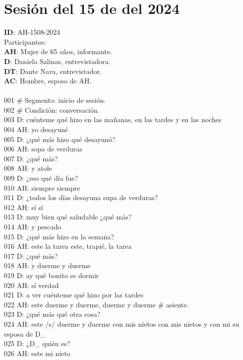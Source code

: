 \section{Sesión del 15 de del 2024}
\noindent
\textbf{ID}: AH-1508-2024\\
Participantes:\\
\textbf{AH}: Mujer de 65 años, informante.\\
\textbf{D}: Daniela Salinas, entrevistadora.\\
\textbf{DT}: Dante Nava, entrevistador.\\
\textbf{AC}: Hombre, esposo de AH.\\
\\
001 \# Segmento: inicio de sesión.\\
002 \# Condición: conversación.\\
003 D: cuénteme qué hizo en las mañanas, en las tardes y en las noches\\
004 AH: yo desayuné\\
005 D: ¿qué más hizo qué desayunó?\\
006 AH: sopa de verduras\\
007 D: ¿qué más?\\
008 AH: y atole\\
009 D: ¿eso qué día fue?\\
010 AH: siempre siempre\\
011 D: ¿todos los días desayuna supa de verduras?\\
012 AH: sí sí\\
013 D: muy bien qué saludable ¿qué más?\\
014 AH: y pescado\\
015 D: ¿qué más hizo en la semana?\\
016 AH: este la tarea este, trapié, la tarea\\
017 D: ¿qué más?\\
018 AH: y duerme y duerme\\
019 D: ay qué bonito es dormir\\
020 AH: sí verdad\\
021 D: a ver cuénteme qué hizo por las tardes\\
022 AH: este duerme y duerme, duerme y duerme \# asiente.\\
023 D: ¿qué más qué otra cosa?\\
024 AH: este /s/ duerme y duerme con mis nietos con mis nietos y con mi su esposa de D\_\\
025 D: ¿D\_ quién es?\\
026 AH: este mi nieto\\
